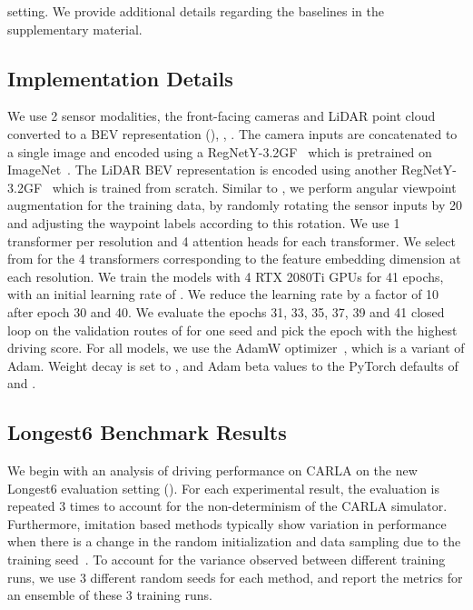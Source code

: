 setting. We provide additional details regarding the baselines in the supplementary material. 

\subsection{Implementation Details}
\label{sec:impl}
 
We use 2 sensor modalities, the front-facing cameras and LiDAR point cloud converted to a BEV representation (), \ie, . The camera inputs are concatenated to a single image and encoded using a RegNetY-3.2GF~\cite{Radosavovic2020CVPR} which is pretrained on ImageNet~\cite{Deng2009CVPR}.  The LiDAR BEV representation is encoded using another RegNetY-3.2GF~\cite{Radosavovic2020CVPR} which is trained from scratch. Similar to \cite{Chen2019CORL}, we perform angular viewpoint augmentation for the training data, by randomly rotating the sensor inputs by 20 and adjusting the waypoint labels according to this rotation. We use 1 transformer per resolution and 4 attention heads for each transformer. We select  from  for the 4 transformers corresponding to the feature embedding dimension  at each resolution. We train the models with 4 RTX 2080Ti GPUs for 41 epochs, with an initial learning rate of  . We reduce the learning rate by a factor of 10 after epoch 30 and 40. We evaluate the epochs 31, 33, 35, 37, 39 and 41 closed loop on the validation routes of \cite{Chitta2021ICCV} for one seed and pick the epoch with the highest driving score. For all models, we use the AdamW optimizer~\cite{Loshchilov2019ICLR}, which is a variant of Adam. Weight decay is set to , and Adam beta values to the PyTorch defaults of  and .

\subsection{Longest6 Benchmark Results}
\label{sec:results_internal}

We begin with an analysis of driving performance on CARLA on the new Longest6 evaluation setting (). For each experimental result, the evaluation is repeated 3 times to account for the non-determinism of the CARLA simulator. Furthermore, imitation based methods typically show variation in performance when there is a change in the random initialization and data sampling due to the training seed~\cite{Behl2020IROS,Prakash2021CVPR}. To account for the variance observed between different training runs, we use 3 different random seeds for each method, and report the metrics for an ensemble of these 3 training runs.

